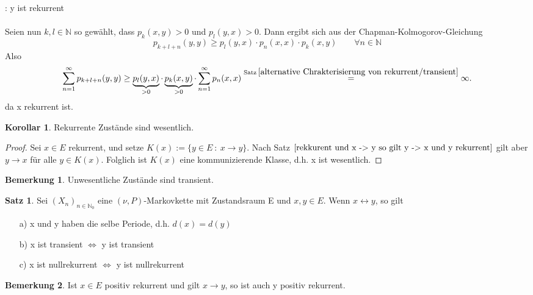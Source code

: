 \documentclass[a4paper,12pt]{scrartcl}
\theoremstyle{definition}
\newtheorem{bem}{Bemerkung}[section]
\newtheorem{sat}{Satz}[section]
\newtheorem{kol}{Korollar}[section]
\begin{document}
\noindent
{}: y ist rekurrent
\\
\\
Seien nun $k,l \in \mathbb{N}$ so gewählt, dass $p_{k}(x,y) > 0$ und $p_{l}(y,x) > 0$. Dann ergibt sich aus der Chapman-Kolmogorov-Gleichung
\begin{equation*}
 p_{k+l+n}(y,y) \geq p_{l}(y,x) \cdot p_{n}(x,x) \cdot p_{k}(x,y) \qquad \forall n \in \mathbb{N}
\end{equation*} 
Also
\begin{equation*}
\sum_{n=1}^{\infty} p_{k+l+n}(y,y) \geq \underbrace{p_{l}(y,x)}_{>0} \cdot \underbrace{p_{k}(x,y)}_{>0} \cdot \sum_{n=1}^{\infty} p_{n}(x,x) \stackrel{\mathrm{Satz} \: \ref{alternative Chrakterisierung von rekurrent/transient}}{=} \infty.
\end{equation*}
da x rekurrent ist.
\begin{kol} 
Rekurrente Zustände sind wesentlich.
\end{kol}
\begin{proof}
Sei $x \in E$ rekurrent, und setze $K(x) := \lbrace y \in E \: : \: x \rightarrow y \rbrace$. Nach Satz $\ref{rekkurent und x -> y so gilt y -> x und y rekurrent}$ gilt aber $y \rightarrow x$ für alle $y \in K(x)$. Folglich ist $K(x)$ eine kommunizierende Klasse, d.h. x ist wesentlich.
\end{proof} 
\begin{bem}
Unwesentliche Zustände sind transient.
\end{bem}
\begin{sat}
\label{x und y selbe Periode, x transient y auch x nullrekurrent y auch}
Sei $(X_{n})_{n \in \mathbb{N}_{0}}$ eine $(\nu,P)$-Markovkette mit Zustandsraum E und $x,y \in E$. Wenn $x \leftrightarrow y$, so gilt
\begin{itemize}
\item[a)] x und y haben die selbe Periode, d.h. $d(x) = d(y)$ 
\item[b)] x ist transient $\Leftrightarrow$ y ist transient
\item[c)] x ist nullrekurrent $\Leftrightarrow$ y ist nullrekurrent
\end{itemize}
\end{sat}
\begin{bem}
\label{Bemerkung 16}
Ist $x \in E$ positiv rekurrent und gilt $x \rightarrow y$, so ist auch y positiv rekurrent.
\end{bem}
\end{document}
